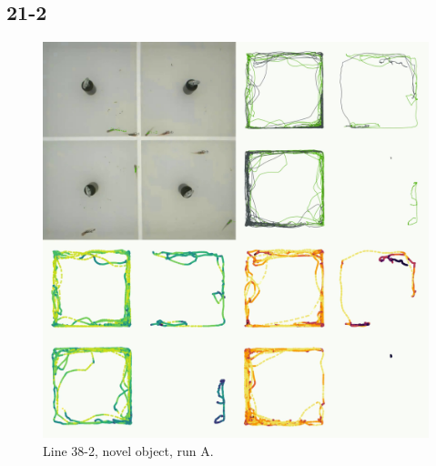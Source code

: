 \documentclass[
]{book}
\begin{document}
\hypertarget{section-10}{%
\subsection{21-2}\label{section-10}}



\begin{figure}
\includegraphics[width=1\linewidth]{figs/mikk_behaviour/four_panel_plots/novel_object_20191113_1527_21-2_L_A_300} \caption{Line 38-2, novel object, run A.}\label{fig:4p-21-2-no-A}
\end{figure}
\end{document}
